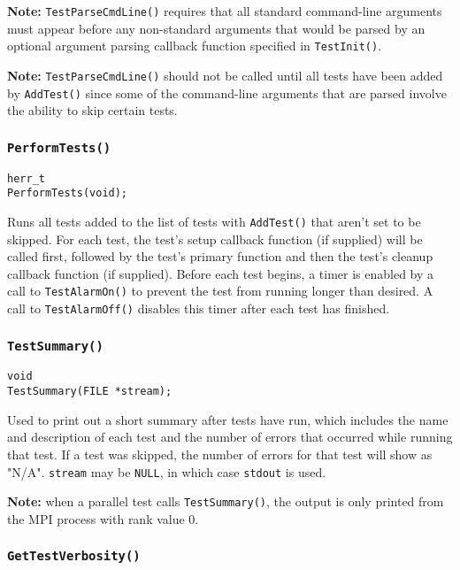 \documentclass[../HDF5_RFC.tex]{subfiles}
\begin{document}
\textbf{Note:} \texttt{TestParseCmdLine()} requires that all standard command-line arguments must appear
before any non-standard arguments that would be parsed by an optional argument parsing callback function specified in \texttt{TestInit()}.

\textbf{Note:} \texttt{TestParseCmdLine()} should not be called until all tests have been added by
\texttt{AddTest()} since some of the command-line arguments that are parsed involve the ability to skip
certain tests.

\subsubsection{\texttt{PerformTests()}}

\begin{verbatim}
herr_t
PerformTests(void);
\end{verbatim}

Runs all tests added to the list of tests with \texttt{AddTest()} that aren't set to be skipped. For
each test, the test's setup callback function (if supplied) will be called first, followed by the test's
primary function and then the test's cleanup callback function (if supplied). Before each test begins,
a timer is enabled by a call to \texttt{TestAlarmOn()} to prevent the test from running longer than
desired. A call to \texttt{TestAlarmOff()} disables this timer after each test has finished.

\subsubsection{\texttt{TestSummary()}}

\begin{verbatim}
void
TestSummary(FILE *stream);
\end{verbatim}

Used to print out a short summary after tests have run, which includes the name and description of
each test and the number of errors that occurred while running that test. If a test was skipped, the
number of errors for that test will show as "N/A". \texttt{stream} may be \texttt{NULL}, in which case
\texttt{stdout} is used.

\textbf{Note:} when a parallel test calls \texttt{TestSummary()}, the output is only printed from the
MPI process with rank value 0.

\subsubsection{\texttt{GetTestVerbosity()}}
\end{document}
